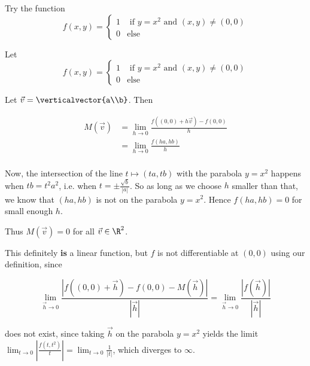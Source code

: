 \documentclass{ximera}
\begin{document}
	\begin{hint}
		Try the function \[f(x,y) = \begin{cases}
			1 & \text{ if $y=x^2$ and $(x,y) \neq (0,0)$}\\
			0 & \text{else}
		\end{cases}\]
	\end{hint}
	
	\begin{free-response}
	Let 
	\[f(x,y) = \begin{cases}
			1 & \text{ if $y=x^2$ and $(x,y) \neq (0,0)$}\\
			0 & \text{else}
		\end{cases}\]
		
	Let $\vec{v} = \verticalvector{a\\b}$.  Then 
	
	\begin{align*}
			M(\vec{v}) &= \lim_{h \to 0}\frac{f((0,0)+h\vec{v}) - f(0,0)}{h}\\
							&= \lim_{h \to 0}\frac{f(ha,hb)}{h}\\
		\end{align*}
		
		Now, the intersection of the line $t \mapsto (ta,tb)$ with the parabola $y=x^2$ happens when $tb = t^2a^2$, i.e. when $t = \pm \frac{\sqrt{b}}{|a|}$.  So as long as
		we choose $h$ smaller than that, we know that $(ha,hb)$ is not on the parabola $y=x^2$.  Hence $f(ha,hb) = 0$ for small enough $h$.
		
		Thus $M(\vec{v}) = 0$ for all $\vec{v}\in \R^2$.
		
		This definitely \textbf{is} a linear function, but $f$ is not differentiable at $(0,0)$ using our definition, since
		
		\[\lim_{\vec{h} \to 0} \frac{\left|f((0,0)+\vec{h}) - f(0,0) - M(\vec{h})\right|}{|\vec{h}|} =  \lim_{\vec{h} \to 0} \frac{\left|f(\vec{h})\right|}{|\vec{h}|} \] 
		
		does not exist, since taking $\vec{h}$ on the parabola $y=x^2$ yields the limit $\lim_{t \to 0} \left| \frac{f(t,t^2)}{t}\right| = \lim_{t \to 0} \frac{1}{|t|}$, which
		diverges to $\infty$. 
		
	\end{free-response}
\end{document}

